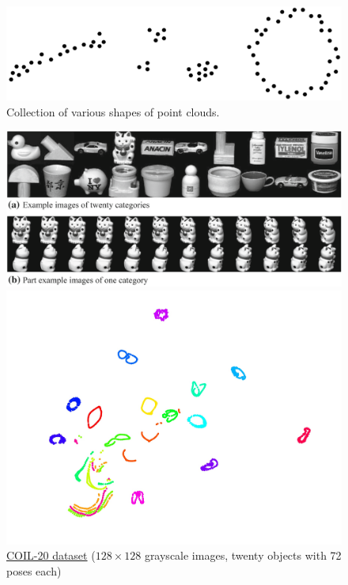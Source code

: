 \documentclass[11pt, a4paper]{amsart}
\begin{document}
\begin{figure}
	\centering
	\includegraphics[width=0.8\linewidth]{figures/topological_data_analysis/topological_data_analysis_collection}
	\caption{
		Collection of various shapes of point clouds.
		\label{fig:topological_data_analysis_collection}
	}
\end{figure}

\begin{figure}[ht]
	\begin{minipage}[b]{0.55\linewidth}
		\centering
		\includegraphics[width=1.0\linewidth]{figures/topological_data_analysis/coil_20_adaptive_graph_embedding_discriminant_projections}
		\caption{
			\href{https://www.cs.columbia.edu/CAVE/software/softlib/coil-20.php}{COIL-20 dataset}
			($128 \times 128$ grayscale images, twenty objects with 72 poses each)
		}
		\label{fig:coil_20}
	\end{minipage}
	\hfill
	\begin{minipage}[b]{0.4\linewidth}
		\centering
		\includegraphics[width=1.0\linewidth]{figures/topological_data_analysis/coil_20_tsne_van_der_maaten}

\end{minipage}
\end{figure}
\end{document}
